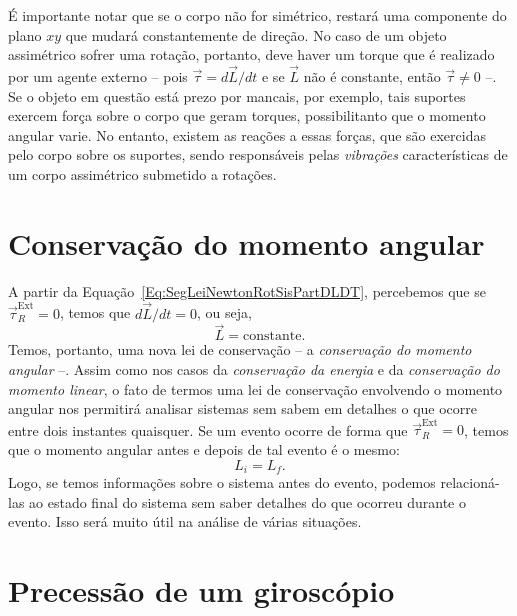 É importante notar que se o corpo não for simétrico, restará uma componente do plano $xy$ que mudará constantemente de direção. No caso de um objeto assimétrico sofrer uma rotação, portanto, deve haver um torque que é realizado por um agente externo -- pois $\vec{\tau} = d\vec{L} / dt$ e se $\vec{L}$ não é constante, então $\vec{\tau} \neq 0$ --. Se o objeto em questão está prezo por mancais, por exemplo, tais suportes exercem força sobre o corpo que geram torques, possibilitanto que o momento angular varie. No entanto, existem as reações a essas forças, que são exercidas pelo corpo sobre os suportes, sendo responsáveis pelas \emph{vibrações} características de um corpo assimétrico submetido a rotações.

\section{Conservação do momento angular}

A partir da Equação~\ref{Eq:SegLeiNewtonRotSisPartDLDT}, percebemos que se $\vec{\tau}_R^{\textrm{Ext}} = 0$, temos que $d\vec{L}/dt = 0$, ou seja,
\begin{equation}
  \vec{L} = \textrm{constante}.
\end{equation}
%
Temos, portanto, uma nova lei de conservação -- a \emph{conservação do momento angular} --. Assim como nos casos da \emph{conservação da energia} e da \emph{conservação do momento linear}, o fato de termos uma lei de conservação envolvendo o momento angular nos permitirá analisar sistemas sem sabem em detalhes o que ocorre entre dois instantes quaisquer. Se um evento ocorre de forma que $\vec{\tau}_R^{\textrm{Ext}} = 0$, temos que o momento angular antes e depois de tal evento é o mesmo:
\begin{equation}
  L_i = L_f.
\end{equation}
%
Logo, se temos informações sobre o sistema antes do evento, podemos relacioná-las ao estado final do sistema sem saber detalhes do que ocorreu durante o evento. Isso será muito útil na análise de várias situações.

\section{Precessão de um giroscópio}

